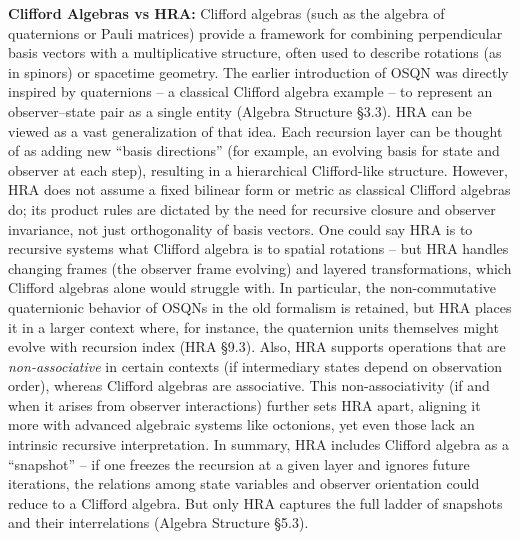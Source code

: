 \documentclass[]{article}
\begin{document}
\textbf{Clifford Algebras vs HRA:} Clifford algebras (such as the
algebra of quaternions or Pauli matrices) provide a framework for
combining perpendicular basis vectors with a multiplicative structure,
often used to describe rotations (as in spinors) or spacetime geometry.
The earlier introduction of OSQN was directly inspired by quaternions --
a classical Clifford algebra example -- to represent an observer--state
pair as a single entity (Algebra Structure §3.3). HRA can be viewed as a
vast generalization of that idea. Each recursion layer can be thought of
as adding new ``basis directions'' (for example, an evolving basis for
state and observer at each step), resulting in a hierarchical
Clifford-like structure. However, HRA does not assume a fixed bilinear
form or metric as classical Clifford algebras do; its product rules are
dictated by the need for recursive closure and observer invariance, not
just orthogonality of basis vectors. One could say HRA is to recursive
systems what Clifford algebra is to spatial rotations -- but HRA handles
changing frames (the observer frame evolving) and layered
transformations, which Clifford algebras alone would struggle with. In
particular, the non-commutative quaternionic behavior of OSQNs in the
old formalism is retained, but HRA places it in a larger context where,
for instance, the quaternion units themselves might evolve with
recursion index (HRA §9.3). Also, HRA supports operations that are
\emph{non-associative} in certain contexts (if intermediary states
depend on observation order), whereas Clifford algebras are associative.
This non-associativity (if and when it arises from observer
interactions) further sets HRA apart, aligning it more with advanced
algebraic systems like octonions, yet even those lack an intrinsic
recursive interpretation. In summary, HRA includes Clifford algebra as a
``snapshot'' -- if one freezes the recursion at a given layer and
ignores future iterations, the relations among state variables and
observer orientation could reduce to a Clifford algebra. But only HRA
captures the full ladder of snapshots and their interrelations (Algebra
Structure §5.3).
\end{document}
